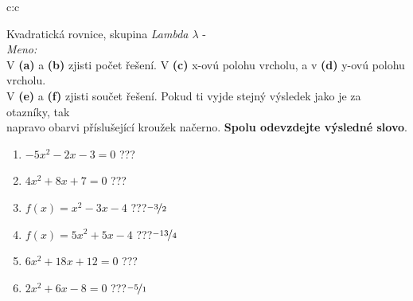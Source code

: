 \documentclass[10pt]{report}
\begin{document}
\clearpage
\thispagestyle{empty}
\begin{tabular}{c:c}
\begin{minipage}[c][99mm][t]{0.49\linewidth}
\begin{center}
\vspace{7mm}
{\huge Kvadratická rovnice, skupina \textit{Lambda $\lambda$} -}\\[4.5mm]
\textit{Meno:}\phantom{xxxxxxxxxxxxxxxxxxxxxxxxxxxxxxxxxxxxxxxxxxxxxxxxxxxxxxxxxxxxxxxxx}\\[3.5mm]
V \textbf{(a)} a \textbf{(b)} zjisti počet řešení. V \textbf{(c)} x-ovú polohu vrcholu, a v \textbf{(d)} y-ovú polohu vrcholu.\\V \textbf{(e)} a \textbf{(f)} zjisti součet řešení. Pokud ti vyjde stejný výsledek jako je za otazníky, tak\\napravo obarvi příslušející kroužek načerno. \textbf{Spolu odevzdejte výsledné slovo}.\\[3mm]
\begin{minipage}{0.77\linewidth}
\begin{center}
\begin{varwidth}{\textwidth}
\begin{enumerate}
\large
\item $-5x^2-2x-3=0$\quad \dotfill\; ???\;\dotfill {}
\item $4x^2+8x+7=0$\quad \dotfill\; ???\;\dotfill {}
\item $f(x)=x^2-3x-4$\quad \dotfill\; ???\;\dotfill \quad $\nicefrac{-3}{2}$
\item $f(x)=5x^2+5x-4$\quad \dotfill\; ???\;\dotfill \quad $\nicefrac{-13}{4}$
\item $6x^2+18x+12=0$\quad \dotfill\; ???\;\dotfill {}
\item $2x^2+6x-8=0$\quad \dotfill\; ???\;\dotfill \quad $\nicefrac{-5}{1}$
\end{enumerate}
\end{varwidth}
\end{center}
\end{minipage}

\end{center}
\end{minipage}
\end{tabular}
\end{document}
